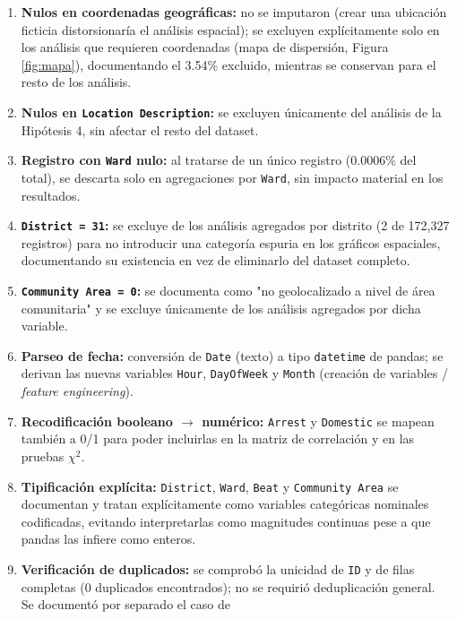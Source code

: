 \documentclass[11pt,a4paper]{article}
\begin{document}
\begin{enumerate}
    \item \textbf{Nulos en coordenadas geográficas:} no se imputaron (crear
    una ubicación ficticia distorsionaría el análisis espacial); se
    excluyen explícitamente solo en los análisis que requieren coordenadas
    (mapa de dispersión, Figura \ref{fig:mapa}), documentando el 3.54\%
    excluido, mientras se conservan para el resto de los análisis.
    \item \textbf{Nulos en \texttt{Location Description}:} se excluyen
    únicamente del análisis de la Hipótesis 4, sin afectar el resto del
    dataset.
    \item \textbf{Registro con \texttt{Ward} nulo:} al tratarse de un único
    registro (0.0006\% del total), se descarta solo en agregaciones por
    \texttt{Ward}, sin impacto material en los resultados.
    \item \textbf{\texttt{District = 31}:} se excluye de los análisis
    agregados por distrito (2 de 172,327 registros) para no introducir una
    categoría espuria en los gráficos espaciales, documentando su existencia
    en vez de eliminarlo del dataset completo.
    \item \textbf{\texttt{Community Area = 0}:} se documenta como "no
    geolocalizado a nivel de área comunitaria" y se excluye únicamente de
    los análisis agregados por dicha variable.
    \item \textbf{Parseo de fecha:} conversión de \texttt{Date} (texto) a
    tipo \texttt{datetime} de pandas; se derivan las nuevas variables
    \texttt{Hour}, \texttt{DayOfWeek} y \texttt{Month} (creación de
    variables / \textit{feature engineering}).
    \item \textbf{Recodificación booleano $\rightarrow$ numérico:}
    \texttt{Arrest} y \texttt{Domestic} se mapean también a 0/1 para poder
    incluirlas en la matriz de correlación y en las pruebas $\chi^2$.
    \item \textbf{Tipificación explícita:} \texttt{District}, \texttt{Ward},
    \texttt{Beat} y \texttt{Community Area} se documentan y tratan
    explícitamente como variables categóricas nominales codificadas,
    evitando interpretarlas como magnitudes continuas pese a que pandas las
    infiere como enteros.
    \item \textbf{Verificación de duplicados:} se comprobó la unicidad de
    \texttt{ID} y de filas completas (0 duplicados encontrados); no se
    requirió deduplicación general. Se documentó por separado el caso de

\end{enumerate}
\end{document}
